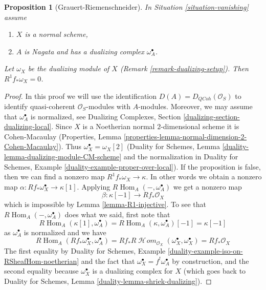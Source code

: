 \documentclass[10pt,a4paper]{amsart}
\theoremstyle{plain}
\newtheorem{proposition}[subsection]{Proposition}
\theoremstyle{definition}
\theoremstyle{remark}
\numberwithin{equation}{subsection}
\def\Hom{\mathop{\mathrm{Hom}}\nolimits}
\def\SheafHom{\mathop{\mathcal{H}\!\mathit{om}}\nolimits}
\def\QCoh{\mathit{QCoh}}
\begin{document}
\begin{proposition}[Grauert-Riemenschneider]
\label{proposition-Grauert-Riemenschneider}
In Situation \ref{situation-vanishing} assume
\begin{enumerate}
\item $X$ is a normal scheme,
\item $A$ is Nagata and has a dualizing complex $\omega_A^\bullet$.
\end{enumerate}
Let $\omega_X$ be the dualizing module of $X$
(Remark \ref{remark-dualizing-setup}). Then $R^1f_*\omega_X = 0$.
\end{proposition}

\begin{proof}
In this proof we will use the identification $D(A) = D_\QCoh(\mathcal{O}_S)$
to identify quasi-coherent $\mathcal{O}_S$-modules with $A$-modules.
Moreover, we may assume that $\omega_A^\bullet$ is normalized, see
Dualizing Complexes, Section \ref{dualizing-section-dualizing-local}.
Since $X$ is a Noetherian normal $2$-dimensional scheme
it is Cohen-Macaulay (Properties, Lemma
\ref{properties-lemma-normal-dimension-2-Cohen-Macaulay}).
Thus $\omega_X^\bullet = \omega_X[2]$ (Duality for Schemes, Lemma
\ref{duality-lemma-dualizing-module-CM-scheme} and the
normalization in Duality for Schemes, Example
\ref{duality-example-proper-over-local}).
If the proposition is false, then we can find a nonzero map
$R^1f_*\omega_X \to \kappa$. In other words we obtain a nonzero map
$\alpha : Rf_*\omega_X^\bullet \to \kappa[1]$.
Applying $R\Hom_A(-, \omega_A^\bullet)$ we get a nonzero map
$$
\beta : \kappa[-1] \longrightarrow Rf_*\mathcal{O}_X
$$
which is impossible by Lemma \ref{lemma-R1-injective}.
To see that $R\Hom_A(-, \omega_A^\bullet)$ does what we said, first
note that
$$
R\Hom_A(\kappa[1], \omega_A^\bullet) =
R\Hom_A(\kappa, \omega_A^\bullet)[-1] =
\kappa[-1]
$$
as $\omega_A^\bullet$ is normalized and we have
$$
R\Hom_A(Rf_*\omega_X^\bullet, \omega_A^\bullet) =
Rf_*R\SheafHom_{\mathcal{O}_X}(\omega_X^\bullet, \omega_X^\bullet) =
Rf_*\mathcal{O}_X
$$
The first equality by
Duality for Schemes, Example \ref{duality-example-iso-on-RSheafHom-noetherian}
and the fact that $\omega_X^\bullet = f^!\omega_A^\bullet$
by construction, and the second equality because $\omega_X^\bullet$
is a dualizing complex for $X$ (which goes back to
Duality for Schemes, Lemma \ref{duality-lemma-shriek-dualizing}).
\end{proof}
\end{document}

